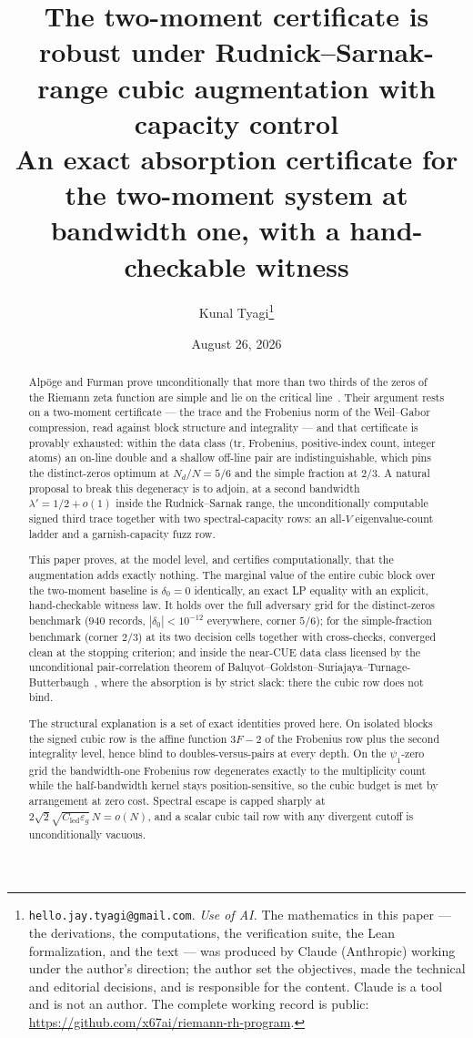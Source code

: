 \documentclass[11pt]{article}
\title{The two-moment certificate is robust under Rudnick--Sarnak-range cubic
augmentation with capacity control\\[2ex]
\large An exact absorption certificate for the two-moment system at bandwidth
one, with a hand-checkable witness}
\author{Kunal Tyagi\thanks{%
\texttt{hello.jay.tyagi@gmail.com}. \emph{Use of AI.} The mathematics in this
paper --- the derivations, the computations, the verification suite, the Lean
formalization, and the text --- was produced by Claude (Anthropic) working
under the author's direction; the author set the objectives, made the technical
and editorial decisions, and is responsible for the content. Claude is a tool
and is not an author. The complete working record is public:
\url{https://github.com/x67ai/riemann-rh-program}.}}
\date{August 26, 2026}
\theoremstyle{plain}
\theoremstyle{definition}
\theoremstyle{remark}
\newcommand{\Cled}{C_{\mathrm{led}}}
\newcommand{\Nd}{N_{d}}
\begin{document}
\maketitle

\begin{abstract}
Alp\"oge and Furman prove unconditionally that more than two thirds of the
zeros of the Riemann zeta function are simple and lie on the critical
line~\cite{AF26}. Their argument rests on a two-moment certificate --- the
trace and the Frobenius norm of the Weil--Gabor compression, read against block
structure and integrality --- and that certificate is provably exhausted:
within the data class (tr, Frobenius, positive-index count, integer atoms) an
on-line double and a shallow off-line pair are indistinguishable, which pins
the distinct-zeros optimum at $\Nd/N = 5/6$ and the simple fraction at $2/3$.
A natural proposal to break this degeneracy is to adjoin, at a second bandwidth
$\lambda' = 1/2 + o(1)$ inside the Rudnick--Sarnak range, the unconditionally
computable signed third trace together with two spectral-capacity rows: an
all-$V$ eigenvalue-count ladder and a garnish-capacity fuzz row.

This paper proves, at the model level, and certifies computationally, that the
augmentation adds exactly nothing. The marginal value of the entire cubic block
over the two-moment baseline is $\delta_0 = 0$ identically, an exact LP
equality with an explicit, hand-checkable witness law. It holds over the full
adversary grid for the distinct-zeros benchmark ($940$ records,
$|\delta_0| < 10^{-12}$ everywhere, corner $5/6$); for the simple-fraction
benchmark (corner $2/3$) at its two decision cells together with cross-checks,
converged clean at the stopping criterion; and inside the near-CUE data class
licensed by the unconditional pair-correlation theorem of
Baluyot--Goldston--Suriajaya--Turnage-Butterbaugh~\cite{BGSTB24}, where the
absorption is by strict slack: there the cubic row does not bind.

The structural explanation is a set of exact identities proved here. On
isolated blocks the signed cubic row is the affine function $3F - 2$ of the
Frobenius row plus the second integrality level, hence blind to
doubles-versus-pairs at every depth. On the $\psi_1$-zero grid the
bandwidth-one Frobenius row degenerates exactly to the multiplicity count while
the half-bandwidth kernel stays position-sensitive, so the cubic budget is met
by arrangement at zero cost. Spectral escape is capped sharply at
$2\sqrt{2}\sqrt{\Cled \varepsilon_g}\,N = o(N)$, and a scalar cubic tail row
with any divergent cutoff is unconditionally vacuous.


\end{abstract}
\end{document}
